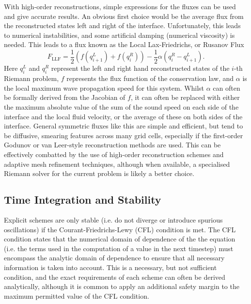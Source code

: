 With high-order reconstructions, simple expressions for the fluxes can be used and give accurate results.
An obvious first choice would be the average flux from the reconstructed states left and right of the interface.
Unfortunately, this leads to numerical instabilities, and some artificial damping (numerical viscosity) is needed.
This leads to a flux known as the Local Lax-Friedrichs, or Rusanov Flux \citep{Rusanov1962}
\begin{equation}
    F_{\mathrm{LLF}} = \frac{1}{2}(f(q_{i+1}^L) + f(q_i^R)) - \frac{1}{2}\alpha(q_i^R - q_{i+1}^L).
\end{equation}
Here $q_i^L$ and $q_i^R$ represent the left and right hand reconstructed states of the $i$-th Riemann problem, $f$ represents the flux function of the conservation law, and $\alpha$ is the local maximum wave propagation speed for this system.
Whilst $\alpha$ can often be formally derived from the Jacobian of $f$, it can often be replaced with either the maximum absolute value of the sum of the sound speed on each side of the interface and the local fluid velocity, or the average of these on both sides of the interface.
General symmetric fluxes like this are simple and efficient, but tend to be diffusive, smearing features across many grid cells, especially if the first-order Godunov or van Leer-style reconstruction methods are used.
This can be effectively combatted by the use of high-order reconstruction schemes and adaptive mesh refinement techniques, although when available, a specialised Riemann solver for the current problem is likely a better choice.

\subsection{Time Integration and Stability}\label{Sec:HydroStability}

Explicit schemes are only stable (i.e. do not diverge or introduce spurious oscillations) if the Courant-Friedrichs-Lewy (CFL) condition is met.
The CFL condition states that the numerical domain of dependence of the the equation (i.e. the terms used in the computation of a value in the next timestep) must encompass the analytic domain of dependence to ensure that all necessary information is taken into account.
This is a necessary, but not sufficient condition, and the exact requirements of each scheme can often be derived analytically, although it is common to apply an additional safety margin to the maximum permitted value of the CFL condition.

